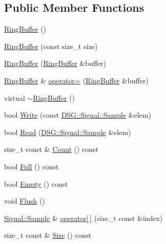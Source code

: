 \subsection*{Public Member Functions}
\begin{DoxyCompactItemize}
\item 
\hyperlink{classDSG_1_1Signal_1_1RingBuffer_a1edb8a1f575c4b54b3e48b3bffdc6870}{Ring\+Buffer} ()
\item 
\hyperlink{classDSG_1_1Signal_1_1RingBuffer_a343b12fc868beffdb0560a39fb08f8ef}{Ring\+Buffer} (const size\+\_\+t size)
\item 
\hyperlink{classDSG_1_1Signal_1_1RingBuffer_aab64a4b23ad98d26b69385a456162ffa}{Ring\+Buffer} (\hyperlink{classDSG_1_1Signal_1_1RingBuffer}{Ring\+Buffer} \&buffer)
\item 
\hyperlink{classDSG_1_1Signal_1_1RingBuffer}{Ring\+Buffer} \& \hyperlink{classDSG_1_1Signal_1_1RingBuffer_a7672004c37ca6c0c00955ac34e55161d}{operator=} (\hyperlink{classDSG_1_1Signal_1_1RingBuffer}{Ring\+Buffer} \&buffer)
\item 
virtual \hyperlink{classDSG_1_1Signal_1_1RingBuffer_ab8638ae724506b4ac70e18d176e01b4e}{$\sim$\+Ring\+Buffer} ()
\item 
bool \hyperlink{classDSG_1_1Signal_1_1RingBuffer_adb769148204396ef1108efd408de4995}{Write} (const \hyperlink{classDSG_1_1Signal_1_1Sample}{D\+S\+G\+::\+Signal\+::\+Sample} \&elem)
\item 
bool \hyperlink{classDSG_1_1Signal_1_1RingBuffer_acb43a346dbfb12e17d9fe774334db8a2}{Read} (\hyperlink{classDSG_1_1Signal_1_1Sample}{D\+S\+G\+::\+Signal\+::\+Sample} \&elem)
\item 
size\+\_\+t const \& \hyperlink{classDSG_1_1Signal_1_1RingBuffer_a2109b3a7b3f355243f30a8bbd0c3cfae}{Count} () const 
\item 
bool \hyperlink{classDSG_1_1Signal_1_1RingBuffer_ab83fc3510ef9e401d65a4522c15357a5}{Full} () const 
\item 
bool \hyperlink{classDSG_1_1Signal_1_1RingBuffer_a714ff99c875fec580d4e7250aa347fdb}{Empty} () const 
\item 
void \hyperlink{classDSG_1_1Signal_1_1RingBuffer_ac6b043ba94abd0e8ed6af820e7fef6cb}{Flush} ()
\item 
\hyperlink{classDSG_1_1Signal_1_1Sample}{Signal\+::\+Sample} \& \hyperlink{classDSG_1_1Buffer_a04a7bfa8343d8459b67d8cf67de404f3}{operator\mbox{[}$\,$\mbox{]}} (size\+\_\+t const \&index)
\item 
size\+\_\+t const \& \hyperlink{classDSG_1_1Buffer_a4acea659d9cd0be652ec55d21e5b0262}{Size} () const 
\end{DoxyCompactItemize}
